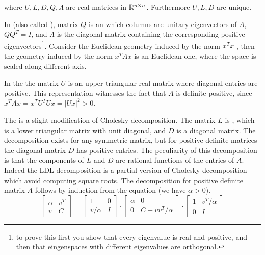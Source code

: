 \documentclass[a4paper,twoside,justified]{tufte-handout}
\begin{document}
where $ U,L,D,Q,\Lambda $ are real matrices in $ \mathbb{R}^{n\times n}
$. Furthermore $ U,L,D $ are unique.

In  (also called
), matrix $ Q $ is an
 which columns are unitary
eigenvectors of $ A $, \ie $ QQ^{T} = I$, and $ \Lambda $ is the
diagonal matrix containing the corresponding positive
eigenvectors\footnote{to prove this first you show that every
  eigenvalue is real and positive, and then that eingenspaces with
  different eigenvalues are orthogonal.}.
%
Consider the Euclidean geometry induced by the norm $ x^{T}x $ , then
the geometry induced by the norm $ x^{T}A x$ is an Euclidean one,
where the space is scaled along different axis.

In the  the matrix $ U $ is an
upper triangular real matrix where diagonal entries are positive. This
representation witnesses the fact that $ A $ is definite positive,
since $ x^{T}A x = x^{T}U^{T}U x = |Ux|^{2} > 0 $.

The  is a slight modification of
Cholesky decomposition. The matrix $ L$ is , which is a lower triangular matrix with unit diagonal,
and $ D $ is a diagonal matrix. The decomposition exists for any
symmetric matrix, but for positive definite matrices the diagonal
matrix $D$ has positive entries. The peculiarity of this
decomposition is that the components of $ L $ and $ D $ are rational
functions of the entries of $ A $. Indeed the LDL decomposition is a
partial version of Cholesky decomposition which avoid computing square
roots. The decomposition for positive definite matrix $A$ follows by
induction from the equation (we have $\alpha>0$).
\begin{equation}\label{eq:matr-decomp}
  \begin{bmatrix}
    \alpha & v^{T} \\
    v & C
  \end{bmatrix} =
  \begin{bmatrix}
    1 & 0 \\
    v/\alpha & I
  \end{bmatrix} \cdot
  \begin{bmatrix}
    \alpha & 0 \\
    0 & C -vv^{T}/\alpha
  \end{bmatrix} \cdot
  \begin{bmatrix}
    1 & v^{T}/\alpha \\
    0 & I
  \end{bmatrix} 
\end{equation}
\end{document}
